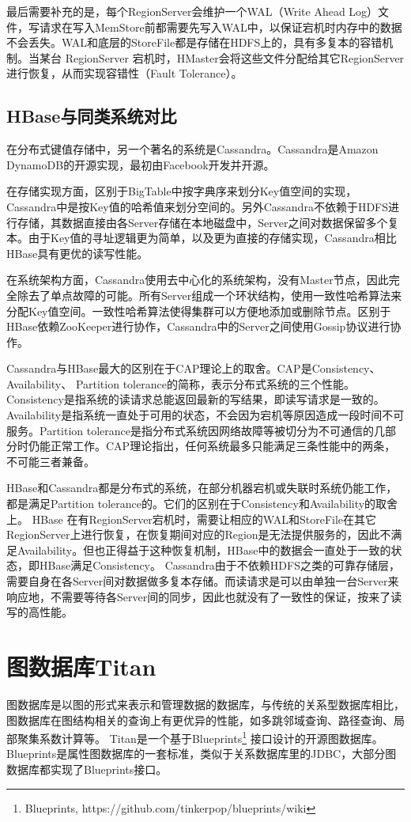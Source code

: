 最后需要补充的是，每个RegionServer会维护一个WAL（Write Ahead Log）文件，写请求在写入MemStore前都需要先写入WAL中，以保证宕机时内存中的数据不会丢失。WAL和底层的StoreFile都是存储在HDFS上的，具有多复本的容错机制。当某台 RegionServer 宕机时，HMaster会将这些文件分配给其它RegionServer进行恢复，从而实现容错性（Fault Tolerance）。

\subsection{HBase与同类系统对比}
在分布式键值存储中，另一个著名的系统是Cassandra\supercite{cassandra}。Cassandra是Amazon DynamoDB\supercite{DynamoDB}的开源实现，最初由Facebook开发并开源。

在存储实现方面，区别于BigTable中按字典序来划分Key值空间的实现，Cassandra中是按Key值的哈希值来划分空间的。另外Cassandra不依赖于HDFS进行存储，其数据直接由各Server存储在本地磁盘中，Server之间对数据保留多个复本。由于Key值的寻址逻辑更为简单，以及更为直接的存储实现，Cassandra相比HBase具有更优的读写性能。

在系统架构方面，Cassandra使用去中心化的系统架构，没有Master节点，因此完全除去了单点故障的可能。所有Server组成一个环状结构，使用一致性哈希算法来分配Key值空间。一致性哈希算法使得集群可以方便地添加或删除节点。区别于HBase依赖ZooKeeper进行协作，Cassandra中的Server之间使用Gossip协议进行协作。

Cassandra与HBase最大的区别在于CAP\supercite{CAP}理论上的取舍。CAP是Consistency、 Availability、 Partition tolerance的简称，表示分布式系统的三个性能。Consistency是指系统的读请求总能返回最新的写结果，即读写请求是一致的。Availability是指系统一直处于可用的状态，不会因为宕机等原因造成一段时间不可服务。Partition tolerance是指分布式系统因网络故障等被切分为不可通信的几部分时仍能正常工作。CAP理论指出，任何系统最多只能满足三条性能中的两条，不可能三者兼备。

HBase和Cassandra都是分布式的系统，在部分机器宕机或失联时系统仍能工作，都是满足Partition tolerance的。它们的区别在于Consistency和Availability的取舍上。
HBase 在有RegionServer宕机时，需要让相应的WAL和StoreFile在其它RegionServer上进行恢复，在恢复期间对应的Region是无法提供服务的，因此不满足Availability。但也正得益于这种恢复机制，HBase中的数据会一直处于一致的状态，即HBase满足Consistency。
Cassandra由于不依赖HDFS之类的可靠存储层，需要自身在各Server间对数据做多复本存储。而读请求是可以由单独一台Server来响应地，不需要等待各Server间的同步，因此也就没有了一致性的保证，按来了读写的高性能。

\section{图数据库Titan}
图数据库是以图的形式来表示和管理数据的数据库\supercite{graph_models_survey}，与传统的关系型数据库相比，图数据库在图结构相关的查询上有更优异的性能，如多跳邻域查询、路径查询、局部聚集系数计算等。
Titan是一个基于Blueprints\footnote{Blueprints, https://github.com/tinkerpop/blueprints/wiki} 接口设计的开源图数据库。Blueprints是属性图数据库的一套标准，类似于关系数据库里的JDBC，大部分图数据库都实现了Blueprints接口。

